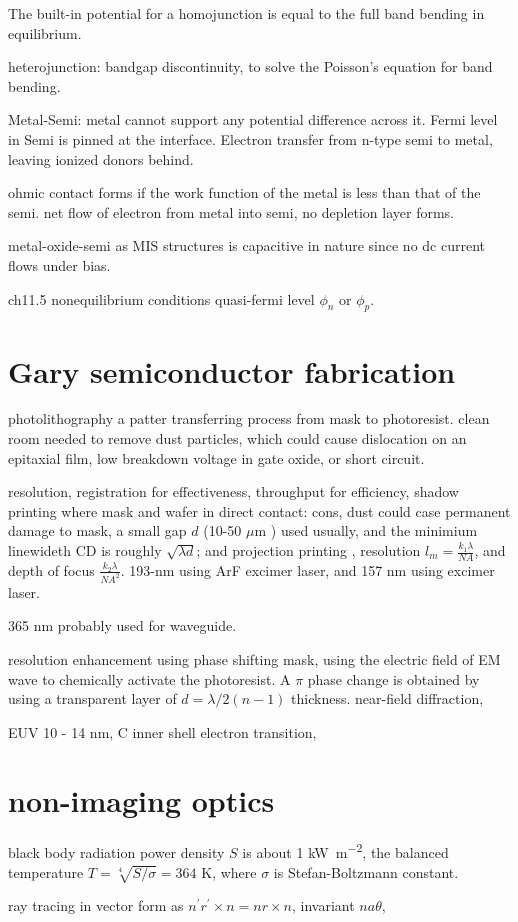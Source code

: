 The built-in potential for a homojunction is equal to the full band bending in equilibrium.

heterojunction: bandgap discontinuity, to solve the Poisson's equation for band bending.

Metal-Semi: metal cannot support any potential difference across it. Fermi level in Semi is pinned at the interface. Electron transfer from n-type semi to metal, leaving ionized donors behind.

ohmic contact forms if the work function of the metal is less than that of the semi. net flow of electron from metal into semi, no depletion layer forms.

metal-oxide-semi as MIS structures is capacitive in nature since no dc current flows under bias.

ch11.5 nonequilibrium conditions
quasi-fermi level $\phi_n$ or $\phi_p$.

\section{Gary semiconductor fabrication} 

photolithography a patter transferring process from mask to photoresist. clean room needed to remove dust particles, which could cause dislocation on an epitaxial film, low breakdown voltage in gate oxide, or short circuit. 

resolution, registration for effectiveness, throughput for efficiency, shadow printing where mask and wafer in direct contact: cons, dust could case permanent damage to mask, a small gap $d$ (10-50 $\mu$m ) used usually, and the minimium linewideth CD is roughly $\sqrt{\lambda d}$; and projection printing , resolution $l_m = \frac{k_1 \lambda}{NA}$, and depth of focus $\frac{k_2 \lambda}{NA^2}$. 193-nm using ArF excimer laser, and 157 nm using  excimer laser. 

365 nm probably used for  waveguide. 

resolution enhancement using phase shifting mask,  using the electric field of EM wave to chemically activate the photoresist. A $\pi$ phase change is obtained by using a transparent layer of $d = \lambda/2(n - 1)$ thickness. near-field diffraction, 

EUV 10 - 14 nm, C inner shell electron transition, 


\section{non-imaging optics}

black body radiation power density $S$ is about 1 \si{kW\per m^2}, the balanced temperature $T = \sqrt[4]{S/\sigma} = 364$ K, where $\sigma$ is Stefan-Boltzmann constant. 

ray tracing in vector form as $n^{\prime} r^{\prime} \times n = n r \times n$, invariant $na\theta$, 





















